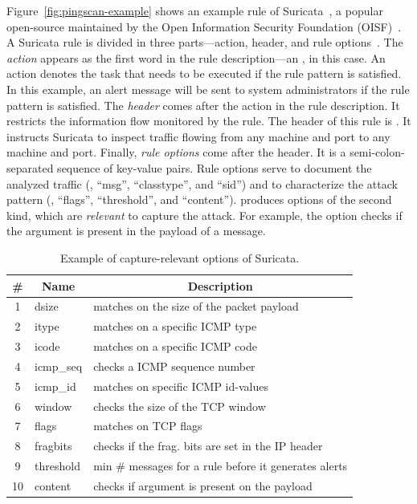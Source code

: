 \documentclass[conference]{IEEEtran}
\begin{document}
Figure~\ref{fig:pingscan-example} shows an example rule of
Suricata~\cite{suricata}, a popular open-source \nids{} maintained by
the Open Information Security Foundation (OISF)~\cite{oisf}.  A
Suricata rule is divided in three parts---action, header, and rule
options~\cite{suri-rule-format}. The \emph{action} appears as the
first word in the rule description---an , in this
case. An action denotes the task that needs to be executed if the
rule pattern is satisfied.  In this example, an alert message will be
sent to system administrators if the rule pattern is
satisfied. The \emph{header} comes after the
action in the rule description. It restricts the information flow
monitored by the rule. The header of this rule is . It instructs Suricata to inspect  traffic
flowing from any machine and port to any machine and port. Finally, \emph{rule options} come after the
header. It is a semi-colon-separated sequence of key-value pairs. Rule
options serve to document the analyzed traffic (\eg{}, ``msg'',
``classtype'', and ``sid'') and to characterize the attack pattern
(\eg, ``flags'', ``threshold'', and ``content''). \tname{} produces
options of the second kind, which are \emph{relevant} to capture the
attack. For example, the option  checks if the
argument is present in the payload of a message.

\begin{table}[t!]
  \footnotesize
  \caption{\label{table:rules}Example of capture-relevant options of Suricata.}
  \vspace{-2ex}
  \centering
  \begin{tabular}{clp{6cm}}
    \toprule
    \multicolumn{1}{c}{\#} & \multicolumn{1}{c}{Name} &  \multicolumn{1}{c}{Description}\\
    \midrule     
    1 & dsize & matches on the size of the packet payload\\
    2 & itype &  matches on a specific ICMP type\\
    3 & icode & matches on a specific ICMP code\\
    4 & icmp\_seq  & checks a ICMP sequence number\\
    5 & icmp\_id & matches on specific ICMP id-values\\
    6 & window & checks the size of the TCP window\\
    7 & flags & matches on TCP flags\\
    8 & fragbits & checks if the frag. bits are set in the IP header\\ %
    9 & threshold & min \# messages for a rule before it generates alerts\\
    10 & content & checks if argument is present on the payload\\
    \bottomrule
  \end{tabular}
  \vspace{-3ex}  
\end{table}
\end{document}
